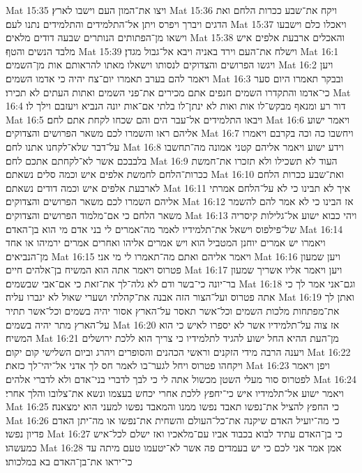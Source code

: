 Mat 15:35  ויצו את־המון העם וישבו לארץ׃
Mat 15:36  ויקח את־שבע ככרות הלחם ואת הדגים ויברך ויפרס ויתן אל־התלמידים והתלמידים נתנו לעם׃
Mat 15:37  ויאכלו כלם וישבעו וישאו מן־הפתותים הנותרים שבעה דודים מלאים׃
Mat 15:38  והאכלים ארבעת אלפים איש מלבד הנשים והטף׃
Mat 15:39  וישלח את־העם וירד באניה ויבא אל־גבול מגדן׃
Mat 16:1  ויגשו הפרושים והצדוקים לנסותו וישאלו מאתו להראותם אות מן־השמים׃
Mat 16:2  ויען ויאמר להם בערב תאמרו יום־צח יהיה כי אדמו השמים׃
Mat 16:3  ובבקר תאמרו היום סער כי־אדמו והתקדרו השמים חנפים אתם מכירים את־פני השמים ואתות העתים לא תכירו׃
Mat 16:4  דור רע ומנאף מבקש־לו אות ואות לא ינתן־לו בלתי אם־אות יונה הנביא ויעזבם וילך לו׃
Mat 16:5  ויבאו התלמידים אל־עבר הים והם שכחו לקחת אתם לחם׃
Mat 16:6  ויאמר ישוע אליהם ראו והשמרו לכם משאר הפרושים והצדוקים׃
Mat 16:7  ויחשבו כה וכה בקרבם ויאמרו על־דבר שלא־לקחנו אתנו לחם׃
Mat 16:8  וידע ישוע ויאמר אליהם קטני אמונה מה־תחשבו בלבבכם אשר לא־לקחתם אתכם לחם׃
Mat 16:9  העוד לא תשכילו ולא תזכרו את־חמשת ככרות־הלחם לחמשת אלפים איש וכמה סלים נשאתם׃
Mat 16:10  ואת־שבע ככרות הלחם לארבעת אלפים איש וכמה דודים נשאתם׃
Mat 16:11  איך לא תבינו כי לא על־הלחם אמרתי אליהם השמרו לכם משאר הפרושים והצדוקים׃
Mat 16:12  אז הבינו כי לא אמר להם להשמר משאר הלחם כי אם־מלמוד הפרושים והצדוקים׃
Mat 16:13  ויהי כבוא ישוע אל־גלילות קיסריה של־פילפוס וישאל את־תלמידיו לאמר מה־אמרים לי בני אדם מי הוא בן־האדם׃
Mat 16:14  ויאמרו יש אמרים יוחנן המטביל הוא ויש אמרים אליהו ואחרים אמרים ירמיהו או אחד מן־הנביאים׃
Mat 16:15  ויאמר אליהם ואתם מה־תאמרו לי מי אני׃
Mat 16:16  ויען שמעון פטרוס ויאמר אתה הוא המשיח בן־אלהים חיים׃
Mat 16:17  ויען ויאמר אליו אשריך שמעון בר־יונה כי־בשר ודם לא גלה־לך את־זאת כי אם־אבי שבשמים׃
Mat 16:18  וגם־אני אמר לך כי אתה פטרוס ועל־הצור הזה אבנה את־קהלתי ושערי שאול לא יגברו עליה׃
Mat 16:19  ואתן לך את־מפתחות מלכות השמים וכל־אשר תאסר על־הארץ אסור יהיה בשמים וכל־אשר תתיר על־הארץ מתר יהיה בשמים׃
Mat 16:20  אז צוה על־תלמידיו אשר לא יספרו לאיש כי הוא המשיח׃
Mat 16:21  מן־העת ההיא החל ישוע להגיד לתלמידיו כי צריך הוא ללכת ירושלים ויענה הרבה מידי הזקנים וראשי הכהנים והסופרים ויהרג וביום השלישי קום יקום׃
Mat 16:22  ויקחהו פטרוס ויחל לגער־בו לאמר חס לך אדני אל־יהי־לך כזאת׃
Mat 16:23  ויפן ויאמר לפטרוס סור מעלי השטן מכשול אתה לי כי לבך לדברי בני־אדם ולא לדברי אלהים׃
Mat 16:24  ויאמר ישוע אל־תלמידיו איש כי־יחפץ ללכת אחרי יכחש בעצמו ונשא את־צלובו והלך אחרי׃
Mat 16:25  כי החפץ להציל את־נפשו תאבד נפשו ממנו והמאבד נפשו למעני הוא ימצאנה׃
Mat 16:26  כי מה־יועיל האדם שיקנה את־כל־העולם והשחית את־נפשו או מה־יתן האדם פדיון נפשו׃
Mat 16:27  כי בן־האדם עתיד לבוא בכבוד אביו עם־מלאכיו ואז ישלם לכל־איש כמעשהו׃
Mat 16:28  אמן אמר אני לכם כי יש בעמדים פה אשר לא־יטעמו טעם מיתה עד כי־יראו את־בן־האדם בא במלכותו׃
